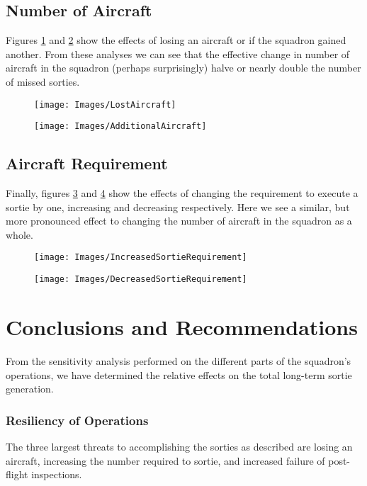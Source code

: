 \documentclass[12pt]{amsart}
\begin{document}
\subsection{Number of Aircraft}
Figures \ref{fig:lostaircraft} and \ref{fig:additionalaircraft}
show the effects of losing an aircraft or if the squadron gained another.
From these analyses we can see that the effective change in number of
aircraft in the squadron (perhaps surprisingly) halve or nearly double the number
of missed sorties.

\begin{figure}
	\centering
	\texttt{[image: Images/LostAircraft]}
	\caption{}
	\label{fig:lostaircraft}
\end{figure}
\begin{figure}
	\centering
	\texttt{[image: Images/AdditionalAircraft]}
	\caption{}
	\label{fig:additionalaircraft}
\end{figure}

\subsection{Aircraft Requirement}
Finally, figures \ref{fig:increasedsortierequirement} and \ref{fig:decreasedsortierequirement}
show the effects of changing the requirement to execute a sortie by one,
increasing and decreasing respectively.
Here we see a similar, but more pronounced effect to changing the number
of aircraft in the squadron as a whole.

\begin{figure}
	\centering
	\texttt{[image: Images/IncreasedSortieRequirement]}
	\caption{}
	\label{fig:increasedsortierequirement}
\end{figure}
\begin{figure}
	\centering
	\texttt{[image: Images/DecreasedSortieRequirement]}
	\caption{}
	\label{fig:decreasedsortierequirement}
\end{figure}


\section{Conclusions and Recommendations}
From the sensitivity analysis performed on the different parts of the
squadron's operations, we have determined the relative effects on the 
total long-term sortie generation.

\subsubsection{Resiliency of Operations}
The three largest threats to accomplishing the sorties as described
are losing an aircraft, increasing the number required to sortie,
and increased failure of post-flight inspections.
\end{document}
